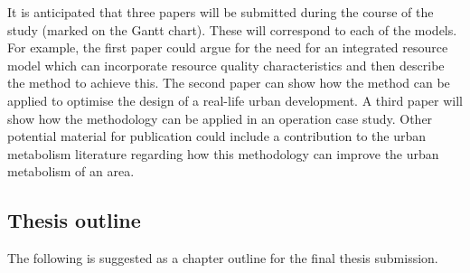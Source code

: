 It is anticipated that three papers will be submitted during the course of the study (marked on the Gantt chart). These will correspond to each of the models. For example, the first paper could argue for the need for an integrated resource model which can incorporate resource quality characteristics and then describe the method to achieve this. The second paper can show how the method can be applied to optimise the design of a real-life urban development. A third paper will show how the methodology can be applied in an operation case study. Other potential material for publication could include a contribution to the urban metabolism literature regarding how this methodology can improve the urban metabolism of an area.

\subsection{Thesis outline}
The following is suggested as a chapter outline for the final thesis submission.
